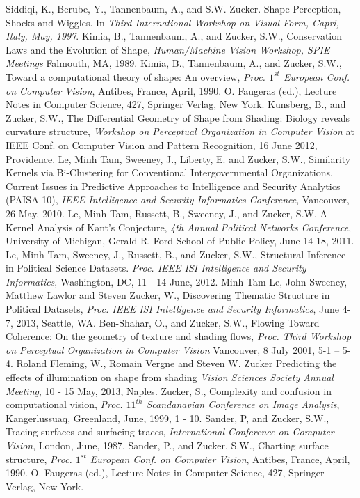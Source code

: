 Siddiqi, K., Berube, Y., Tannenbaum, A., and S.W. Zucker. Shape Perception, Shocks and Wiggles. In {\em Third International Workshop on Visual Form, Capri, Italy, May, 1997}.
Kimia, B., Tannenbaum, A., and Zucker, S.W., Conservation Laws and the Evolution of Shape, {\it Human/Machine Vision Workshop, SPIE Meetings} Falmouth, MA, 1989.
Kimia, B., Tannenbaum, A., and Zucker, S.W., Toward a computational theory of shape: An overview, {\it Proc. $1^{st}$ European Conf. on Computer Vision}, Antibes, France, April, 1990. O. Faugeras (ed.), Lecture Notes in Computer Science, 427, Springer Verlag, New York.
Kunsberg, B., and Zucker, S.W., The Differential Geometry of Shape from Shading:  Biology reveals curvature structure, {\em Workshop on Perceptual Organization in Computer Vision} at IEEE Conf. on Computer Vision and Pattern Recognition, 16 June 2012, Providence.
Le, Minh Tam, Sweeney, J., Liberty, E. and Zucker, S.W., Similarity Kernels via Bi-Clustering for Conventional Intergovernmental Organizations, Current Issues in Predictive Approaches to Intelligence and Security Analytics (PAISA-10), {\em IEEE Intelligence and Security Informatics Conference}, Vancouver, 26 May, 2010.
Le, Minh-Tam, Russett, B., Sweeney, J., and Zucker, S.W. A Kernel Analysis of Kant's Conjecture, {\em 4th Annual Political Networks Conference}, University of Michigan, Gerald R. Ford School of Public Policy, June 14-18, 2011.
Le, Minh-Tam, Sweeney, J., Russett, B., and Zucker, S.W., Structural Inference in Political Science Datasets. {\em Proc. IEEE ISI Intelligence and Security Informatics}, Washington, DC, 11 - 14 June, 2012.
Minh-Tam Le, John Sweeney, Matthew Lawlor and Steven Zucker, W., Discovering Thematic Structure in Political Datasets, {\em Proc. IEEE ISI Intelligence and Security Informatics}, June 4-7, 2013, Seattle, WA.
Ben-Shahar, O., and Zucker, S.W., Flowing Toward Coherence: On the geometry of texture and shading flows, {\it Proc. Third Workshop on Perceptual Organization in Computer Vision} Vancouver, 8 July 2001, 5-1 -- 5-4.
Roland Fleming, W., Romain Vergne and Steven W. Zucker Predicting the effects of illumination on shape from shading {\em Vision Sciences Society Annual Meeting},  10 - 15 May, 2013, Naples.
Zucker, S., Complexity and confusion in computational vision, {\em Proc. $11^{th}$ Scandanavian Conference on Image Analysis}, Kangerlussuaq, Greenland, June, 1999, 1 - 10.
Sander, P, and Zucker, S.W., Tracing surfaces and surfacing traces, {\it International Conference on Computer Vision}, London, June, 1987.
Sander, P., and Zucker, S.W., Charting surface structure, {\it Proc. $1^{st}$ European Conf. on Computer Vision}, Antibes, France, April, 1990. O. Faugeras (ed.), Lecture Notes in Computer Science, 427, Springer Verlag, New York.
